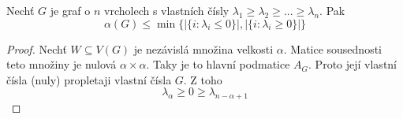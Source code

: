\begin{theorem}
	Nechť $G$ je graf o $n$ vrcholech s vlastních čísly $\lambda_1 \geq \lambda_2 \geq ... \geq \lambda_n$. Pak
	\[ \alpha(G) \leq \min\{|\{i : \lambda_i \leq 0\}|, |\{i : \lambda_i \geq 0\}|\} \]
\end{theorem}
\begin{proof}
	Nechť $W \subseteq V(G)$ je nezávislá množina velkosti $\alpha$. Matice sousednosti teto množiny je nulová $\alpha \times \alpha$.
	Taky je to hlavní podmatice $A_G$. Proto její vlastní čísla (nuly) propletaji vlastní čísla $G$. Z toho
	\[ \lambda_{\alpha} \geq 0 \geq \lambda_{n - \alpha + 1} \]
\end{proof}
